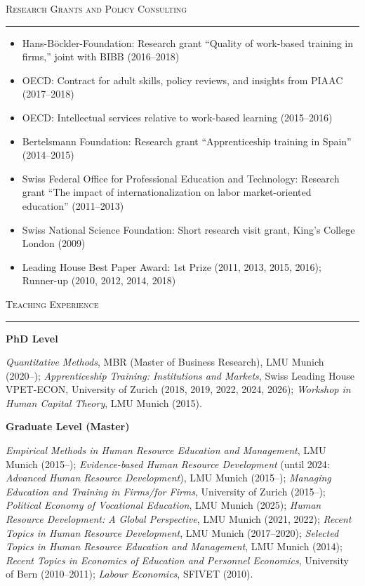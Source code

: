 \documentclass[11pt,a4paper]{article}
\newcommand{\cvsection}[1]{%
  \vspace{1.1em}%
  {\large\textsc{#1}}\par
  \vspace{0.15em}\hrule\vspace{0.65em}%
}
\begin{document}
\cvsection{Research Grants and Policy Consulting}

\begin{itemize}[leftmargin=1.2em,itemsep=0.15em,topsep=0pt]
  \item Hans-B\"ockler-Foundation: Research grant ``Quality of work-based training in firms,'' joint with BIBB (2016--2018)
  \item OECD: Contract for adult skills, policy reviews, and insights from PIAAC (2017--2018)
  \item OECD: Intellectual services relative to work-based learning (2015--2016)
  \item Bertelsmann Foundation: Research grant ``Apprenticeship training in Spain'' (2014--2015)
  \item Swiss Federal Office for Professional Education and Technology: Research grant ``The impact of internationalization on labor market-oriented education'' (2011--2013)
  \item Swiss National Science Foundation: Short research visit grant, King's College London (2009)
  \item Leading House Best Paper Award: 1st Prize (2011, 2013, 2015, 2016); Runner-up (2010, 2012, 2014, 2018)
\end{itemize}

\cvsection{Teaching Experience}

\textbf{PhD Level}\par
\textit{Quantitative Methods}, MBR (Master of Business Research), LMU Munich (2020--); \textit{Apprenticeship Training: Institutions and Markets}, Swiss Leading House VPET-ECON, University of Zurich (2018, 2019, 2022, 2024, 2026); \textit{Workshop in Human Capital Theory}, LMU Munich (2015).

\vspace{0.5em}
\textbf{Graduate Level (Master)}\par
\textit{Empirical Methods in Human Resource Education and Management}, LMU Munich (2015--); \textit{Evidence-based Human Resource Development} (until 2024: \textit{Advanced Human Resource Development}), LMU Munich (2015--); \textit{Managing Education and Training in Firms/for Firms}, University of Zurich (2015--); \textit{Political Economy of Vocational Education}, LMU Munich (2025); \textit{Human Resource Development: A Global Perspective}, LMU Munich (2021, 2022); \textit{Recent Topics in Human Resource Development}, LMU Munich (2017--2020); \textit{Selected Topics in Human Resource Education and Management}, LMU Munich (2014); \textit{Recent Topics in Economics of Education and Personnel Economics}, University of Bern (2010--2011); \textit{Labour Economics}, SFIVET (2010).
\end{document}

